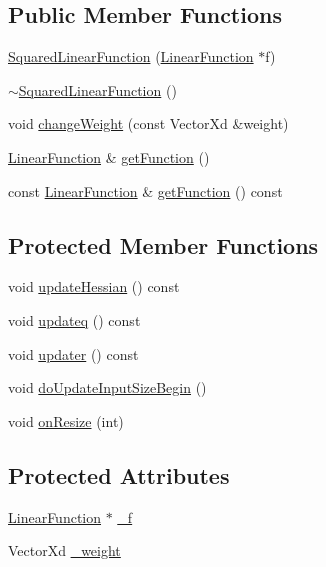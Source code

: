 \subsection*{Public Member Functions}
\begin{DoxyCompactItemize}
\item 
\hyperlink{classocra_1_1SquaredLinearFunction_ae0a8957e1371ef2681494298cd19c040}{Squared\+Linear\+Function} (\hyperlink{classocra_1_1LinearFunction}{Linear\+Function} $\ast$f)
\item 
\hyperlink{classocra_1_1SquaredLinearFunction_adc5c823cc6559151ef1081e8ff62624a}{$\sim$\+Squared\+Linear\+Function} ()
\item 
void \hyperlink{classocra_1_1SquaredLinearFunction_a4c8e5adac8c2d7af02880d4ac5011f83}{change\+Weight} (const Vector\+Xd \&weight)
\item 
\hyperlink{classocra_1_1LinearFunction}{Linear\+Function} \& \hyperlink{classocra_1_1SquaredLinearFunction_aff22d70c8edf05b5b488ffe6ce426e87}{get\+Function} ()
\item 
const \hyperlink{classocra_1_1LinearFunction}{Linear\+Function} \& \hyperlink{classocra_1_1SquaredLinearFunction_a3ab1215a6687d72cc56727ccb35ccb3a}{get\+Function} () const
\end{DoxyCompactItemize}
\subsection*{Protected Member Functions}
\begin{DoxyCompactItemize}
\item 
void \hyperlink{classocra_1_1SquaredLinearFunction_a194606ccd86f17dbc73a6c3bdf2455c9}{update\+Hessian} () const
\item 
void \hyperlink{classocra_1_1SquaredLinearFunction_a6fec3532febfdea70c28457ea826111e}{updateq} () const
\item 
void \hyperlink{classocra_1_1SquaredLinearFunction_ab74b479275839850f1c98ac2fa3137bd}{updater} () const
\item 
void \hyperlink{classocra_1_1SquaredLinearFunction_a95faea59867ec734fbdb46d936067d77}{do\+Update\+Input\+Size\+Begin} ()
\item 
void \hyperlink{classocra_1_1SquaredLinearFunction_a9e6a87607548f1f1eac56eecfc1b05b5}{on\+Resize} (int)
\end{DoxyCompactItemize}
\subsection*{Protected Attributes}
\begin{DoxyCompactItemize}
\item 
\hyperlink{classocra_1_1LinearFunction}{Linear\+Function} $\ast$ \hyperlink{classocra_1_1SquaredLinearFunction_a9848211537e6dc386ab237e6a1e233dc}{\+\_\+f}
\item 
Vector\+Xd \hyperlink{classocra_1_1SquaredLinearFunction_ad21985a66257244ce79648a507ad5220}{\+\_\+weight}
\end{DoxyCompactItemize}
